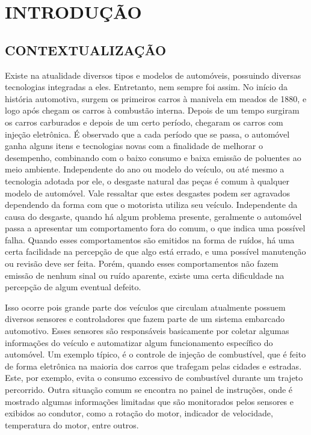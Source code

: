\chapter{INTRODUÇÃO}\label{CAP:introducao}

\section{CONTEXTUALIZAÇÃO}
Existe na atualidade diversos tipos e modelos de automóveis, possuindo diversas tecnologias integradas a eles. Entretanto, nem sempre foi assim. No início da história automotiva, surgem os primeiros carros à manivela em meados de 1880, e logo após chegam os carros à combustão interna. Depois de um tempo surgiram os carros carburados e depois de um certo período, chegaram os carros com injeção eletrônica. É observado que a cada período que se passa, o automóvel ganha alguns itens e tecnologias novas com a finalidade de melhorar o desempenho, combinando com o baixo consumo e baixa emissão de poluentes ao meio ambiente. Independente do ano ou modelo do veículo, ou até mesmo a tecnologia adotada por ele, o desgaste natural das peças é comum à qualquer modelo de automóvel. Vale ressaltar que estes desgastes podem ser agravados dependendo da forma com que o motorista utiliza seu veículo. Independente da causa do desgaste, quando há algum problema presente, geralmente o automóvel passa a apresentar um comportamento fora do comum, o que indica uma possível falha. Quando esses comportamentos são emitidos na forma de ruídos, há uma certa facilidade na percepção de que algo está errado, e uma possível manutenção ou revisão deve ser feita. Porém, quando esses comportamentos não fazem emissão de nenhum sinal ou ruído aparente, existe uma certa dificuldade na percepção de algum eventual defeito.

Isso ocorre pois grande parte dos veículos que circulam atualmente possuem diversos sensores e controladores que fazem parte de um sistema embarcado automotivo. Esses sensores são responsáveis basicamente por coletar algumas informações do veículo e automatizar algum funcionamento específico do automóvel. Um exemplo típico, é o controle de injeção de combustível, que é feito de forma eletrônica na maioria dos carros que trafegam pelas cidades e estradas. Este, por exemplo, evita o consumo excessivo de combustível durante um trajeto percorrido. Outra situação comum se encontra no painel de instruções, onde é mostrado algumas informações limitadas que são monitorados pelos sensores e exibidos ao condutor, como a rotação do motor, indicador de velocidade, temperatura do motor, entre outros. 


